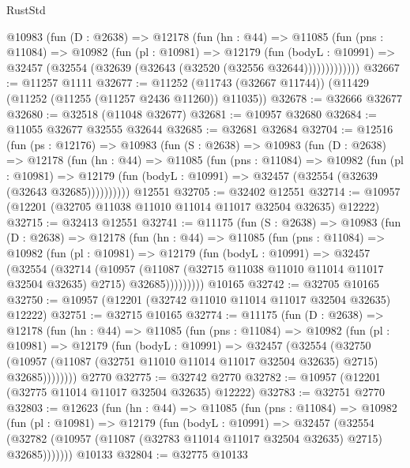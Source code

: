 \begin{lexlean}{RustStd}
\begin{coremodule}
        @10983
          (fun (D : @2638) =>
          @12178
            (fun (hn : @44) =>
            @11085
              (fun (pns : @11084) =>
              @10982
                (fun (pl : @10981) =>
                @12179
                  (fun (bodyL : @10991) =>
                  @32457 (@32554 (@32639 (@32643 (@32520 (@32556 @32644)))))))))))))
@32667 := @11257 @1111
@32677 := @11252 (@11743 (@32667 @11744)) (@11429 (@11252 (@11255 (@11257 @2436 @11260)) @11035))
@32678 := @32666 @32677
@32680 := @32518 (@11048 @32677)
@32681 := @10957 @32680
@32684 := @11055 @32677 @32555 @32644
@32685 := @32681 @32684
@32704 := @12516
    (fun (ps : @12176) =>
    @10983
      (fun (S : @2638) =>
      @10983
        (fun (D : @2638) =>
        @12178
          (fun (hn : @44) =>
          @11085
            (fun (pns : @11084) =>
            @10982
              (fun (pl : @10981) =>
              @12179 (fun (bodyL : @10991) => @32457 (@32554 (@32639 (@32643 @32685))))))))))
    @12551
@32705 := @32402 @12551
@32714 := @10957 (@12201 (@32705 @11038 @11010 @11014 @11017 @32504 @32635) @12222)
@32715 := @32413 @12551
@32741 := @11175
    (fun (S : @2638) =>
    @10983
      (fun (D : @2638) =>
      @12178
        (fun (hn : @44) =>
        @11085
          (fun (pns : @11084) =>
          @10982
            (fun (pl : @10981) =>
            @12179
              (fun (bodyL : @10991) =>
              @32457
                (@32554
                  (@32714
                    (@10957
                      (@11087 (@32715 @11038 @11010 @11014 @11017 @32504 @32635) @2715)
                      @32685)))))))))
    @10165
@32742 := @32705 @10165
@32750 := @10957 (@12201 (@32742 @11010 @11014 @11017 @32504 @32635) @12222)
@32751 := @32715 @10165
@32774 := @11175
    (fun (D : @2638) =>
    @12178
      (fun (hn : @44) =>
      @11085
        (fun (pns : @11084) =>
        @10982
          (fun (pl : @10981) =>
          @12179
            (fun (bodyL : @10991) =>
            @32457
              (@32554
                (@32750
                  (@10957 (@11087 (@32751 @11010 @11014 @11017 @32504 @32635) @2715) @32685))))))))
    @2770
@32775 := @32742 @2770
@32782 := @10957 (@12201 (@32775 @11014 @11017 @32504 @32635) @12222)
@32783 := @32751 @2770
@32803 := @12623
    (fun (hn : @44) =>
    @11085
      (fun (pns : @11084) =>
      @10982
        (fun (pl : @10981) =>
        @12179
          (fun (bodyL : @10991) =>
          @32457
            (@32554
              (@32782 (@10957 (@11087 (@32783 @11014 @11017 @32504 @32635) @2715) @32685)))))))
    @10133
@32804 := @32775 @10133

\end{coremodule}
\end{lexlean}

